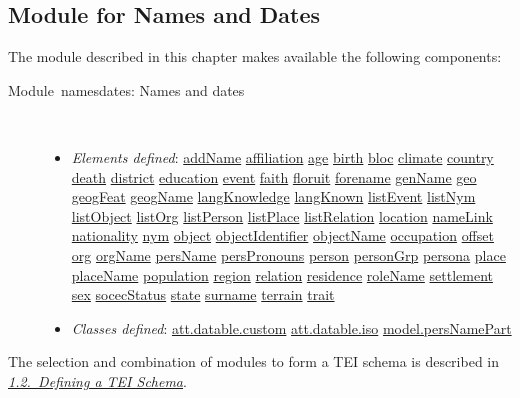 \subsection[{Module for Names and Dates}]{Module for Names and Dates}\par
The module described in this chapter makes available the following components: \begin{description}

\item[{Module namesdates: Names and dates}]\hspace{1em}\hfill\linebreak
\mbox{}\\[-10pt] \begin{itemize}
\item {\itshape Elements defined}: \hyperref[TEI.addName]{addName} \hyperref[TEI.affiliation]{affiliation} \hyperref[TEI.age]{age} \hyperref[TEI.birth]{birth} \hyperref[TEI.bloc]{bloc} \hyperref[TEI.climate]{climate} \hyperref[TEI.country]{country} \hyperref[TEI.death]{death} \hyperref[TEI.district]{district} \hyperref[TEI.education]{education} \hyperref[TEI.event]{event} \hyperref[TEI.faith]{faith} \hyperref[TEI.floruit]{floruit} \hyperref[TEI.forename]{forename} \hyperref[TEI.genName]{genName} \hyperref[TEI.geo]{geo} \hyperref[TEI.geogFeat]{geogFeat} \hyperref[TEI.geogName]{geogName} \hyperref[TEI.langKnowledge]{langKnowledge} \hyperref[TEI.langKnown]{langKnown} \hyperref[TEI.listEvent]{listEvent} \hyperref[TEI.listNym]{listNym} \hyperref[TEI.listObject]{listObject} \hyperref[TEI.listOrg]{listOrg} \hyperref[TEI.listPerson]{listPerson} \hyperref[TEI.listPlace]{listPlace} \hyperref[TEI.listRelation]{listRelation} \hyperref[TEI.location]{location} \hyperref[TEI.nameLink]{nameLink} \hyperref[TEI.nationality]{nationality} \hyperref[TEI.nym]{nym} \hyperref[TEI.object]{object} \hyperref[TEI.objectIdentifier]{objectIdentifier} \hyperref[TEI.objectName]{objectName} \hyperref[TEI.occupation]{occupation} \hyperref[TEI.offset]{offset} \hyperref[TEI.org]{org} \hyperref[TEI.orgName]{orgName} \hyperref[TEI.persName]{persName} \hyperref[TEI.persPronouns]{persPronouns} \hyperref[TEI.person]{person} \hyperref[TEI.personGrp]{personGrp} \hyperref[TEI.persona]{persona} \hyperref[TEI.place]{place} \hyperref[TEI.placeName]{placeName} \hyperref[TEI.population]{population} \hyperref[TEI.region]{region} \hyperref[TEI.relation]{relation} \hyperref[TEI.residence]{residence} \hyperref[TEI.roleName]{roleName} \hyperref[TEI.settlement]{settlement} \hyperref[TEI.sex]{sex} \hyperref[TEI.socecStatus]{socecStatus} \hyperref[TEI.state]{state} \hyperref[TEI.surname]{surname} \hyperref[TEI.terrain]{terrain} \hyperref[TEI.trait]{trait}
\item {\itshape Classes defined}: \hyperref[TEI.att.datable.custom]{att.datable.custom} \hyperref[TEI.att.datable.iso]{att.datable.iso} \hyperref[TEI.model.persNamePart]{model.persNamePart}
\end{itemize} 
\end{description}  The selection and combination of modules to form a TEI schema is described in \textit{\hyperref[STIN]{1.2.\ Defining a TEI Schema}}.